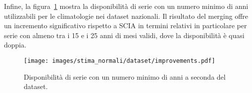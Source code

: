 Infine, la figura~\ref{fig:merged-improvements} mostra la disponibilità di serie con un numero minimo di anni utilizzabili per le climatologie nei dataset nazionali. Il risultato del merging offre un incremento significativo rispetto a SCIA in termini relativi in particolare per serie con almeno tra i 15 e i 25 anni di mesi validi, dove la disponibilità è quasi doppia.
\begin{figure}[ht]
  \centering
  \texttt{[image: images/stima\_normali/dataset/improvements.pdf]}
  \caption{\small Disponibilità di serie con un numero minimo di anni a seconda del dataset.}\label{fig:merged-improvements}
\end{figure}